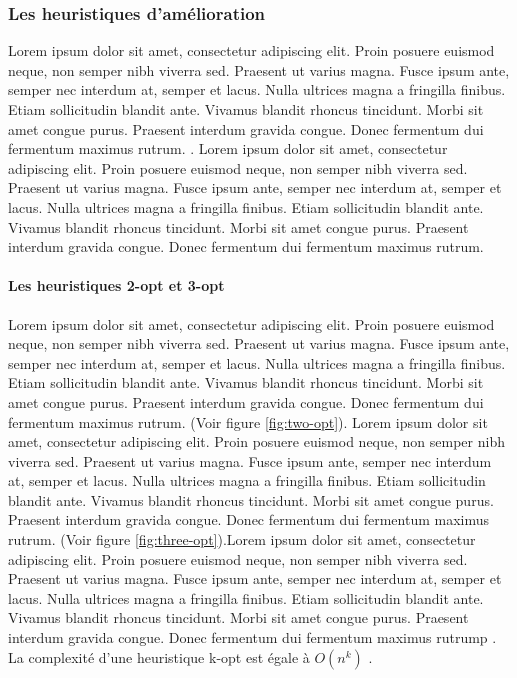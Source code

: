 \medskip

\subsubsection{Les heuristiques d'amélioration}
Lorem ipsum dolor sit amet, consectetur adipiscing elit. Proin posuere euismod neque, non semper nibh viverra sed. Praesent ut varius magna. Fusce ipsum ante, semper nec interdum at, semper et lacus. Nulla ultrices magna a fringilla finibus. Etiam sollicitudin blandit ante. Vivamus blandit rhoncus tincidunt. Morbi sit amet congue purus. Praesent interdum gravida congue. Donec fermentum dui fermentum maximus rutrum. \parencite{anbuudayasankar_survey_2014}. Lorem ipsum dolor sit amet, consectetur adipiscing elit. Proin posuere euismod neque, non semper nibh viverra sed. Praesent ut varius magna. Fusce ipsum ante, semper nec interdum at, semper et lacus. Nulla ultrices magna a fringilla finibus. Etiam sollicitudin blandit ante. Vivamus blandit rhoncus tincidunt. Morbi sit amet congue purus. Praesent interdum gravida congue. Donec fermentum dui fermentum maximus rutrum.


\paragraph{Les heuristiques 2-opt et 3-opt}
Lorem ipsum dolor sit amet, consectetur adipiscing elit. Proin posuere euismod neque, non semper nibh viverra sed. Praesent ut varius magna. Fusce ipsum ante, semper nec interdum at, semper et lacus. Nulla ultrices magna a fringilla finibus. Etiam sollicitudin blandit ante. Vivamus blandit rhoncus tincidunt. Morbi sit amet congue purus. Praesent interdum gravida congue. Donec fermentum dui fermentum maximus rutrum. (Voir figure \ref{fig:two-opt}). Lorem ipsum dolor sit amet, consectetur adipiscing elit. Proin posuere euismod neque, non semper nibh viverra sed. Praesent ut varius magna. Fusce ipsum ante, semper nec interdum at, semper et lacus. Nulla ultrices magna a fringilla finibus. Etiam sollicitudin blandit ante. Vivamus blandit rhoncus tincidunt. Morbi sit amet congue purus. Praesent interdum gravida congue. Donec fermentum dui fermentum maximus rutrum. (Voir figure \ref{fig:three-opt}).Lorem ipsum dolor sit amet, consectetur adipiscing elit. Proin posuere euismod neque, non semper nibh viverra sed. Praesent ut varius magna. Fusce ipsum ante, semper nec interdum at, semper et lacus. Nulla ultrices magna a fringilla finibus. Etiam sollicitudin blandit ante. Vivamus blandit rhoncus tincidunt. Morbi sit amet congue purus. Praesent interdum gravida congue. Donec fermentum dui fermentum maximus rutrump \parencite{davendra_traveling_2010}. La complexité d'une heuristique k-opt est égale à $O(n^k)$ \parencite{golden_approximate_1980}.

